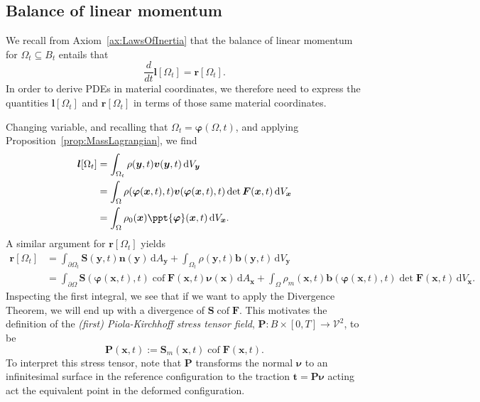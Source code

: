 \documentclass[
  letterpaper,
  DIV=11,
  numbers=noendperiod]{scrreprt}
\theoremstyle{plain}
\theoremstyle{remark}
\begin{document}
\subsection{Balance of linear
momentum}\label{balance-of-linear-momentum-1}

We recall from Axiom~\hyperref[ax:LawsOfInertia]{{[}ax:LawsOfInertia{]}}
that the balance of linear momentum for \(\Omega_t\subseteq B_t\)
entails that
\[\frac{d}{dt}{\boldsymbol{l}}[\Omega_t] = {\boldsymbol{r}}[\Omega_t].\]
In order to derive PDEs in material coordinates, we therefore need to
express the quantities \({\boldsymbol{l}}[\Omega_t]\) and
\({\boldsymbol{r}}[\Omega_t]\) in terms of those same material
coordinates.

Changing variable, and recalling that
\(\Omega_t={\boldsymbol{\varphi}}(\Omega,t)\), and applying
Proposition~\hyperref[prop:MassLagrangian]{{[}prop:MassLagrangian{]}},
we find \[\begin{aligned}
  {\boldsymbol{l}}[\Omega_t]
  &= \int_{\Omega_t} \rho({\boldsymbol{y}},t){\boldsymbol{v}}({\boldsymbol{y}},t){\,{\mathrm{d}}V_{{\boldsymbol{y}}}}\\
  &=\int_\Omega \rho({\boldsymbol{\varphi}}({\boldsymbol{x}},t),t){\boldsymbol{v}}({\boldsymbol{\varphi}}({\boldsymbol{x}},t),t)\det{\boldsymbol{F}}({\boldsymbol{x}},t){\,{\mathrm{d}}V_{{\boldsymbol{x}}}}\\
  &=\int_\Omega \rho_0({\boldsymbol{x}})\ppt{{\boldsymbol{\varphi}}}({\boldsymbol{x}},t){\,{\mathrm{d}}V_{{\boldsymbol{x}}}}.
\end{aligned}\] A similar argument for \({\boldsymbol{r}}[\Omega_t]\)
yields \[\begin{aligned}
  {\boldsymbol{r}}[\Omega_t]
  &= \int_{\partial \Omega_t} {\boldsymbol{S}}({\boldsymbol{y}},t){\boldsymbol{n}}({\boldsymbol{y}}){\,{\mathrm{d}}A_{{\boldsymbol{y}}}}+\int_{\Omega_t}\rho({\boldsymbol{y}},t){\boldsymbol{b}}({\boldsymbol{y}},t){\,{\mathrm{d}}V_{{\boldsymbol{y}}}}\\
  &= \int_{\partial \Omega} {\boldsymbol{S}}({\boldsymbol{\varphi}}({\boldsymbol{x}},t),t){\operatorname{cof}}{\boldsymbol{F}}({\boldsymbol{x}},t){\boldsymbol{\nu}}({\boldsymbol{x}}){\,{\mathrm{d}}A_{{\boldsymbol{x}}}}+\int_{\Omega}\rho_m({\boldsymbol{x}},t){\boldsymbol{b}}({\boldsymbol{\varphi}}({\boldsymbol{x}},t),t)\det{\boldsymbol{F}}({\boldsymbol{x}},t){\,{\mathrm{d}}V_{{\boldsymbol{x}}}}.
\end{aligned}\] Inspecting the first integral, we see that if we want to
apply the Divergence Theorem, we will end up with a divergence of
\({\boldsymbol{S}}{\operatorname{cof}}{\boldsymbol{F}}\). This motivates
the definition of the \emph{(first) Piola-Kirchhoff stress tensor
field}, \({\boldsymbol{P}}:B\times[0,T]\to{\mathcal{V}}^2\), to be
\[{\boldsymbol{P}}({\boldsymbol{x}},t) := {\boldsymbol{S}}_m({\boldsymbol{x}},t){\operatorname{cof}}{\boldsymbol{F}}({\boldsymbol{x}},t).\]
To interpret this stress tensor, note that \({\boldsymbol{P}}\)
transforms the normal \({\boldsymbol{\nu}}\) to an infinitesimal surface
in the reference configuration to the traction
\({\boldsymbol{t}}= {\boldsymbol{P}}{\boldsymbol{\nu}}\) acting act the
equivalent point in the deformed configuration.
\end{document}
